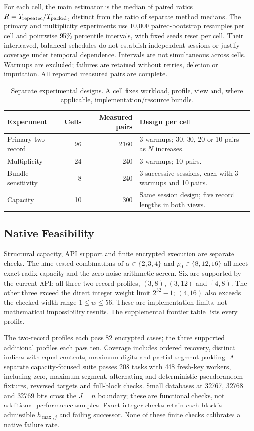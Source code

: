 For each cell, the main estimator is the median of paired ratios
\(R=T_{\rm repeated}/T_{\rm packed}\), distinct from the ratio of separate
method medians. The primary and multiplicity experiments use 10,000
paired-bootstrap resamples per cell and pointwise 95\% percentile
intervals, with fixed seeds reset per cell. Their interleaved, balanced
schedules do not establish independent sessions or justify coverage under
temporal dependence. Intervals are not simultaneous across cells. Warmups
are excluded; failures are retained without retries, deletion or
imputation. All reported measured pairs are complete.

\begin{table}[tbp]
\centering\small
\caption{Separate experimental designs. A cell fixes workload, profile,
view and, where applicable, implementation/resource bundle.}
\label{tab:design}
\begin{tabularx}{\linewidth}{@{}lrrX@{}}
\toprule Experiment & Cells & Measured pairs & Design per cell \\
\midrule
Primary two-record & 96 & 2160 & 3 warmups; 30, 30, 20 or 10 pairs as $N$ increases. \\
Multiplicity & 24 & 240 & 3 warmups; 10 pairs. \\
Bundle sensitivity & 8 & 240 & 3 successive sessions, each with 3 warmups and 10 pairs. \\
Capacity & 10 & 300 & Same session design; five record lengths in both views. \\
\bottomrule\end{tabularx}
\end{table}

\subsection{Native Feasibility}
\label{sec:native-validation}
Structural capacity, API support and finite encrypted execution are
separate checks. The nine tested combinations of
\(\alpha\in\{2,3,4\}\) and \(\rho_0\in\{8,12,16\}\) all meet exact radix
capacity and the zero-noise arithmetic screen. Six are supported by the
current API: all three two-record profiles, \((3,8)\), \((3,12)\) and
\((4,8)\). The other three exceed the direct integer weight limit
\(2^{32}-1\); \((4,16)\) also exceeds the checked width range
\(1\le w\le56\). These are implementation limits, not mathematical
impossibility results. The supplemental frontier table lists every profile.

The two-record profiles each pass 82 encrypted cases; the three supported
additional profiles each pass ten. Coverage includes ordered recovery,
distinct indices with equal contents, maximum digits and partial-segment
padding. A separate capacity-focused suite passes 208 tasks with 448
fresh-key workers, including zero, maximum-segment, alternating and
deterministic pseudorandom fixtures, reversed targets and full-block checks.
Small databases at 32767, 32768 and 32769 bits cross the \(J=n\) boundary;
these are functional checks, not additional performance samples. Exact
integer checks retain each block's admissible \(h_{\max,j}\) and failing
successor. None of these finite checks calibrates a native failure rate.

